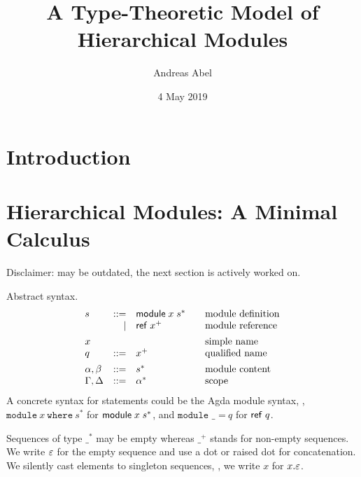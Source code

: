\documentclass{article}
\title{A Type-Theoretic Model of Hierarchical Modules}
\author{Andreas Abel}
\date{4 May 2019}
\theoremstyle{definition}
\theoremstyle{plain}
\theoremstyle{remark}
\begin{document}
\maketitle

\begin{abstract}
\end{abstract}

\section{Introduction}
\label{sec:intro}

\section{Hierarchical Modules: A Minimal Calculus}

Disclaimer: may be outdated, the next section is actively worked on.

Abstract syntax.
\[
\begin{array}{lrl@{\qquad}l}
  s & ::=  & \mdef x {s^*}    & \mbox{module definition} \\
    & \mid & \mref {x^+}      & \mbox{module reference}  \\[1ex]
  x &  &                      & \mbox{simple name}       \\
  q & ::=  & x^+              & \mbox{qualified name}    \\[1ex]
  \alpha,\beta  & ::= & s^*   & \mbox{module content}    \\
  \Gamma,\Delta & ::= & \Ga^* & \mbox{scope}             \\
\end{array}
\]
A concrete syntax for statements could be the Agda module syntax, \ie,
$\texttt{module}~x~\texttt{where}~s^*$ for $\mathsf{module}\;x\;s^*$, and
$\texttt{module~\_~=}~q$ for $\mathsf{ref}\;q$.

Sequences of type $\_^*$ may be empty whereas $\_^+$ stands for
non-empty sequences.
We write $\varepsilon$ for the empty sequence and use a dot or raised dot
for concatenation.
We silently cast elements to singleton sequences, \eg,
we write $x$ for $x.\varepsilon$.
\end{document}
